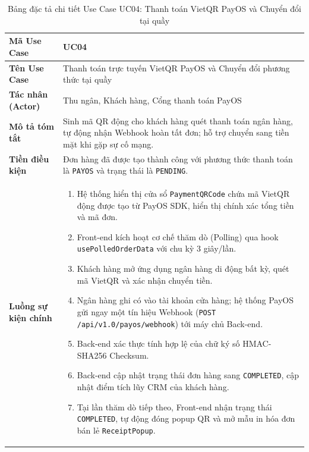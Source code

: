 \begin{table}[htbp]
\centering
\caption{Bảng đặc tả chi tiết Use Case UC04: Thanh toán VietQR PayOS và Chuyển đổi tại quầy}
\label{tab:uc04_payos}
\vspace{2mm}
\begin{tabularx}{\textwidth}{|l|X|}
\hline
\textbf{Mã Use Case} & \textbf{UC04} \\ \hline
\textbf{Tên Use Case} & Thanh toán trực tuyến VietQR PayOS và Chuyển đổi phương thức tại quầy \\ \hline
\textbf{Tác nhân (Actor)} & Thu ngân, Khách hàng, Cổng thanh toán PayOS \\ \hline
\textbf{Mô tả tóm tắt} & Sinh mã QR động cho khách hàng quét thanh toán ngân hàng, tự động nhận Webhook hoàn tất đơn; hỗ trợ chuyển sang tiền mặt khi gặp sự cố mạng. \\ \hline
\textbf{Tiền điều kiện} & Đơn hàng đã được tạo thành công với phương thức thanh toán là \texttt{PAYOS} và trạng thái là \texttt{PENDING}. \\ \hline
\textbf{Luồng sự kiện chính} & 
\begin{enumerate}[leftmargin=*, nosep]
    \item Hệ thống hiển thị cửa sổ \texttt{PaymentQRCode} chứa mã VietQR động được tạo từ PayOS SDK, hiển thị chính xác tổng tiền và mã đơn.
    \item Front-end kích hoạt cơ chế thăm dò (Polling) qua hook \texttt{usePolledOrderData} với chu kỳ $3$ giây/lần.
    \item Khách hàng mở ứng dụng ngân hàng di động bất kỳ, quét mã VietQR và xác nhận chuyển tiền.
    \item Ngân hàng ghi có vào tài khoản cửa hàng; hệ thống PayOS gửi ngay một tín hiệu Webhook (\texttt{POST /api/v1.0/payos/webhook}) tới máy chủ Back-end.
    \item Back-end xác thực tính hợp lệ của chữ ký số HMAC-SHA256 Checksum.
    \item Back-end cập nhật trạng thái đơn hàng sang \texttt{COMPLETED}, cập nhật điểm tích lũy CRM của khách hàng.
    \item Tại lần thăm dò tiếp theo, Front-end nhận trạng thái \texttt{COMPLETED}, tự động đóng popup QR và mở mẫu in hóa đơn bán lẻ \texttt{ReceiptPopup}.
\end{enumerate} \\ \hline

\end{tabularx}
\end{table}
